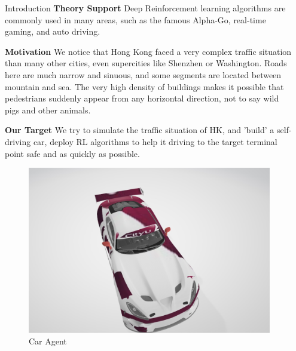 \documentclass[final]{beamer}
\newlength{\sepwid}
\newlength{\onecolwid}
\begin{document}
\begin{frame}[t]
\begin{columns}[t]
\begin{column}{\onecolwid}

\begin{block}{Introduction} %
\textbf{Theory Support} Deep Reinforcement learning algorithms are commonly used in many areas, such as the famous Alpha-Go, real-time gaming, and auto driving.

\textbf{Motivation} We notice that Hong Kong faced a very complex traffic situation than many other cities, even supercities like Shenzhen or Washington. Roads here are much narrow and sinuous, and some segments are located between mountain and sea. The very high density of buildings makes it possible that pedestrians suddenly appear from any horizontal direction, not to say wild pigs and other animals.

\textbf{Our Target} We try to simulate the traffic situation of HK, and 'build' a self-driving car, deploy RL algorithms to help it driving to the target terminal point safe and as quickly as possible.


\end{block}


\begin{figure}
\includegraphics[width=0.6\linewidth]{carModel.jpeg}
\caption{Car Agent}
\end{figure}

\end{column} %


\begin{column}{\sepwid}\end{column} %


\end{columns}
\end{frame}
\end{document}
